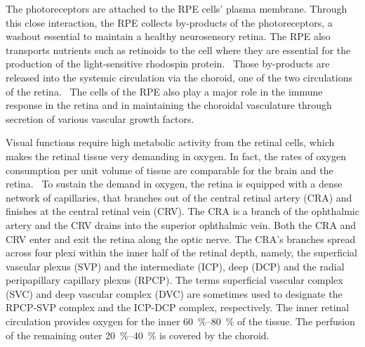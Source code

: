 \documentclass[12pt,a4paper]{journal}
\begin{document}
The photoreceptors are attached to the RPE cells' plasma membrane.
Through this close interaction, the RPE collects by-products of the photoreceptors, a washout essential to maintain a healthy neurosensory retina.
The RPE also transports nutrients such as retinoids to the cell where they are essential for the production of the light-sensitive rhodospin protein.~\cite{Boulton_2001} 
Those by-products are released into the systemic circulation via the choroid, one of the two circulations of the retina.~\cite{Boulton_2001}
The cells of the RPE also play a major role in the immune response in the retina and in maintaining the choroidal vasculature through secretion of various vascular growth factors.~\cite{Boulton_2001,Detrick_2020} 


Visual functions require high metabolic activity from the retinal cells, which makes the retinal tissue very demanding in oxygen.
In fact, the rates of oxygen consumption per unit volume of tissue are comparable for the brain and the retina.~\cite{Medrano_1995}
To sustain the demand in oxygen, the retina is equipped with a dense network of capillaries, that branches out of the central retinal artery (CRA) and finishes at the central retinal vein (CRV).
The CRA is a branch of the ophthalmic artery and the CRV drains into the superior ophthalmic vein.
Both the CRA and CRV enter and exit the retina along the optic nerve.
The CRA's branches spread across four plexi within the inner half of the retinal depth, namely, the superficial vascular plexus (SVP) and the intermediate (ICP), deep (DCP) and the radial peripapillary capillary plexus (RPCP).
The terms superficial vascular complex (SVC) and deep vascular complex (DVC) are sometimes used to designate the RPCP-SVP complex and the ICP-DCP complex, respectively.
The inner retinal circulation provides oxygen for the inner \SIrange{60}{80}{\percent} of the tissue.
The perfusion of the remaining outer \SIrange{20}{40}{\percent} is covered by the choroid.
\end{document}
